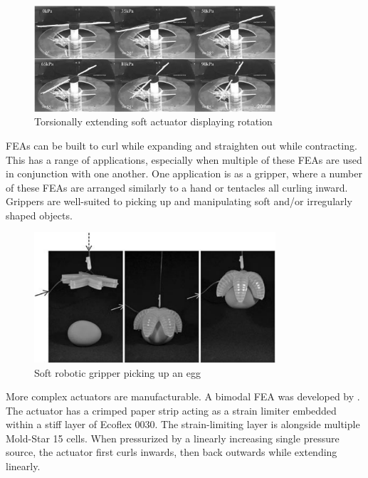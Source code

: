 \begin{figure}[H]
	\centering
	\includegraphics[width=0.8\textwidth]{TorsionalExtension.png}
	\caption[Torsionally extending soft actuator]{Torsionally extending soft actuator displaying rotation \citep{Yan2018}}
	\label{fig:tea}
\end{figure}

FEAs can be built to curl while expanding and straighten out while contracting. This has a range of applications, especially when multiple of these FEAs are used in conjunction with one another. One application is as a gripper, where a number of these FEAs are arranged similarly to a hand or tentacles all curling inward. Grippers are well-suited to picking up and manipulating soft and/or irregularly shaped objects. \citep{Ilievski2011}

\begin{figure}[H]
	\centering
	\includegraphics[width=0.8\textwidth]{Gripper.png}
	\caption[Soft robotic gripper]{Soft robotic gripper picking up an egg \citep{Ilievski2011}}
	\label{fig:grip}
\end{figure}

More complex actuators are manufacturable. A bimodal FEA was developed by \cite{Ellis2020}. The actuator has a crimped paper strip acting as a strain limiter embedded within a stiff layer of Ecoflex 0030. The strain-limiting layer is alongside multiple Mold-Star 15 cells. When pressurized by a linearly increasing single pressure source, the actuator  first curls inwards, then back outwards while extending linearly. \citep{Ellis2020}

